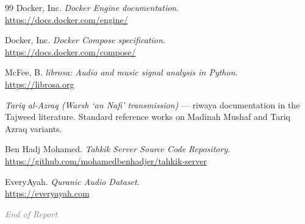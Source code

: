 \begin{thebibliography}{99}
Docker, Inc. \emph{Docker Engine documentation}. \\
\url{https://docs.docker.com/engine/}

Docker, Inc. \emph{Docker Compose specification}. \\
\url{https://docs.docker.com/compose/}

McFee, B. \emph{librosa: Audio and music signal analysis in Python}. \\
\url{https://librosa.org}

\emph{Tariq al-Azraq (Warsh `an Nafi' transmission)} --- riwaya documentation in the Tajweed literature. Standard reference works on Madinah Mushaf and Tariq Azraq variants.

Ben Hadj Mohamed. \emph{Tahkik Server Source Code Repository}. \\
\url{https://github.com/mohamedbenhadjer/tahkik-server}

EveryAyah. \emph{Quranic Audio Dataset}. \\
\url{https://everyayah.com}

\end{thebibliography}

\vfill
\begin{center}
\textcolor{slategray}{\itshape End of Report}
\end{center}
